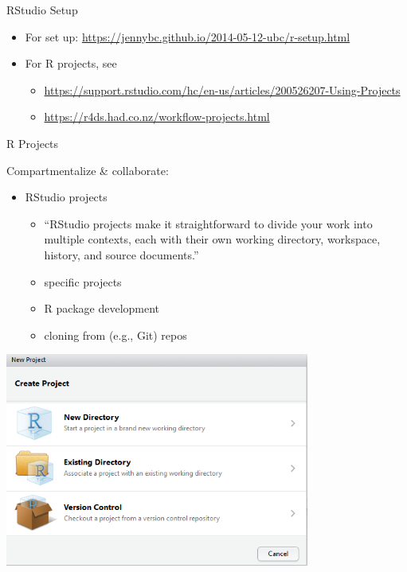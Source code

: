 \documentclass[
  ignorenonframetext,
]{beamer}
\providecommand{\tightlist}{%
  \setlength{\itemsep}{0pt}\setlength{\parskip}{0pt}}
\begin{document}
\begin{frame}{RStudio Setup}
\protect\hypertarget{rstudio-setup-1}{}

\begin{itemize}[<+->]
\tightlist
\item
  For set up:
  \url{https://jennybc.github.io/2014-05-12-ubc/r-setup.html}
\item
  For R projects, see

  \begin{itemize}[<+->]
  \tightlist
  \item
    \url{https://support.rstudio.com/hc/en-us/articles/200526207-Using-Projects}
  \item
    \url{https://r4ds.had.co.nz/workflow-projects.html}
  \end{itemize}
\end{itemize}

\end{frame}

\begin{frame}{R Projects}
\protect\hypertarget{r-projects}{}

Compartmentalize \& collaborate:

\begin{itemize}[<+->]
\tightlist
\item
  RStudio projects

  \begin{itemize}[<+->]
  \tightlist
  \item
    ``RStudio projects make it straightforward to divide your work into
    multiple contexts, each with their own working directory, workspace,
    history, and source documents.''
  \item
    specific projects
  \item
    R package development
  \item
    cloning from (e.g., Git) repos
  \end{itemize}
\end{itemize}

\end{frame}

\begin{frame}

\includegraphics[width=0.75\textwidth,height=\textheight]{../external/images/setup_2_rstudio_project.PNG}

\end{frame}
\end{document}
